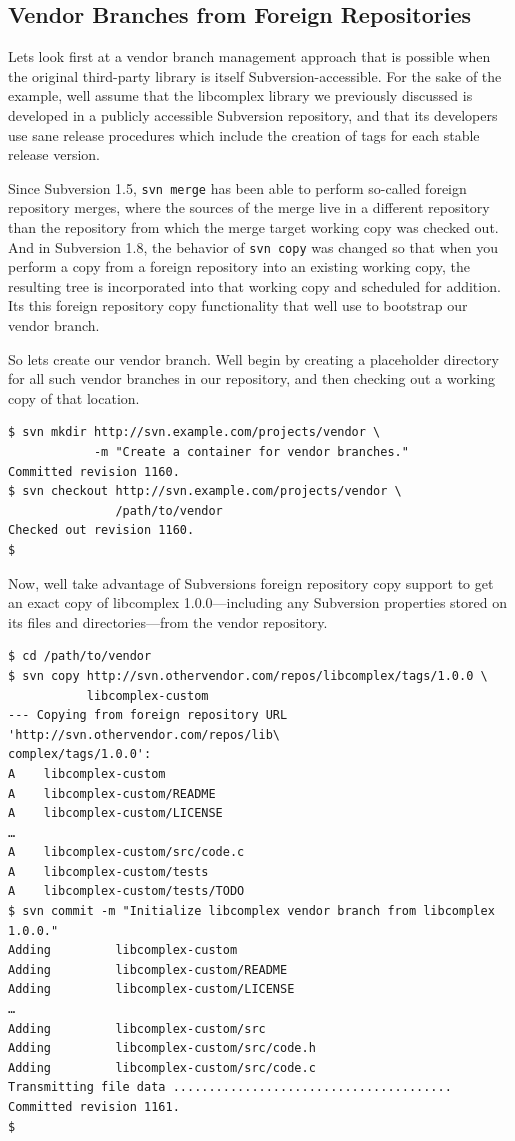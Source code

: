 \subsection{Vendor Branches from Foreign
Repositories}\label{svn.advanced.vendorbr.foreign-repos}

Let\textquotesingle s look first at a vendor branch management approach
that is possible when the original third-party library is itself
Subversion-accessible. For the sake of the example,
we\textquotesingle ll assume that the libcomplex library we previously
discussed is developed in a publicly accessible Subversion repository,
and that its developers use sane release procedures which include the
creation of tags for each stable release version.

Since Subversion 1.5, \texttt{svn\ merge} has been able to perform
so-called foreign repository merges, where the sources of the merge live
in a different repository than the repository from which the merge
target working copy was checked out. And in Subversion 1.8, the behavior
of \texttt{svn\ copy} was changed so that when you perform a copy from a
foreign repository into an existing working copy, the resulting tree is
incorporated into that working copy and scheduled for addition.
It\textquotesingle s this foreign repository copy functionality that
we\textquotesingle ll use to bootstrap our vendor branch.

So let\textquotesingle s create our vendor branch. We\textquotesingle ll
begin by creating a placeholder directory for all such vendor branches
in our repository, and then checking out a working copy of that
location.

\begin{verbatim}
$ svn mkdir http://svn.example.com/projects/vendor \
            -m "Create a container for vendor branches."
Committed revision 1160.
$ svn checkout http://svn.example.com/projects/vendor \
               /path/to/vendor
Checked out revision 1160.
$
\end{verbatim}

Now, we\textquotesingle ll take advantage of
Subversion\textquotesingle s foreign repository copy support to get an
exact copy of libcomplex 1.0.0---including any Subversion properties
stored on its files and directories---from the vendor repository.

\begin{verbatim}
$ cd /path/to/vendor
$ svn copy http://svn.othervendor.com/repos/libcomplex/tags/1.0.0 \
           libcomplex-custom
--- Copying from foreign repository URL 'http://svn.othervendor.com/repos/lib\
complex/tags/1.0.0':
A    libcomplex-custom
A    libcomplex-custom/README
A    libcomplex-custom/LICENSE
…
A    libcomplex-custom/src/code.c
A    libcomplex-custom/tests
A    libcomplex-custom/tests/TODO
$ svn commit -m "Initialize libcomplex vendor branch from libcomplex 1.0.0."
Adding         libcomplex-custom
Adding         libcomplex-custom/README
Adding         libcomplex-custom/LICENSE
…
Adding         libcomplex-custom/src
Adding         libcomplex-custom/src/code.h
Adding         libcomplex-custom/src/code.c
Transmitting file data .......................................
Committed revision 1161.
$
\end{verbatim}

